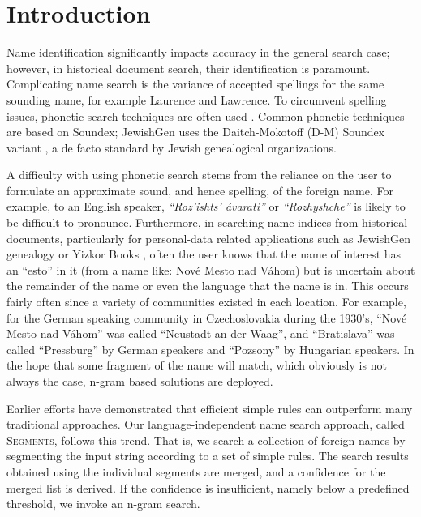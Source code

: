 \documentclass{endm}
\begin{document}
\begin{CJK}{UTF8}{song}
\begin{frontmatter}
\end{frontmatter}

\section{Introduction}\label{s:introduce}
Name identification significantly impacts accuracy in the general search case; however, in historical document search, their identification is paramount.  Complicating name search is the variance of accepted spellings for the same sounding name, for example Laurence and Lawrence.  To circumvent spelling issues, phonetic search techniques are often used \cite{zobel:phonetic}.  Common phonetic techniques are based on Soundex; JewishGen \cite{jewishgen.org} uses the Daitch-Mokotoff (D-M) Soundex variant \cite{mokotoff:soundexing}, a de facto standard by Jewish genealogical organizations.  

A difficulty with using phonetic search stems from the reliance on the user to formulate an approximate sound, and hence spelling, of the foreign name.  For example, to an English speaker, \emph{``Roz'ishts' \'avarati''} or \emph{``Rozhyshche''} is likely to be difficult to pronounce.  Furthermore, in searching name indices from historical documents, particularly for personal-data related applications such as JewishGen genealogy \cite{jewishgen.org} or Yizkor Books \cite{amir:from}, often the user knows that the name of interest has an ``esto'' in it (from a name like: Nov\'e Mesto nad V\'ahom) but is uncertain about the remainder of the name or even the language that the name is in.  This occurs fairly often since a variety of communities existed in each location.  For example, for the German speaking community in Czechoslovakia during the 1930's, ``Nov\'e Mesto nad V\'ahom'' was called ``Neustadt an der Waag'', and ``Bratislava'' was called ``Pressburg'' by German speakers and ``Pozsony'' by Hungarian speakers.  In the hope that some fragment of the name will match, which obviously is not always the case, n-gram based solutions \cite{manning:introduction} are deployed.  

Earlier efforts \cite{aljlayl:on,aqeel:on,guy:the} have demonstrated that efficient simple rules can outperform many traditional approaches. Our language-independent name search approach, called S\textsc{egments}, follows this trend.  That is, we search a collection of foreign names by segmenting the input string according to a set of simple rules. The search results obtained using the individual segments are merged, and a confidence for the merged list is derived.  If the confidence is insufficient, namely below a predefined threshold, we invoke an n-gram search.  


\end{CJK}
\end{document}
